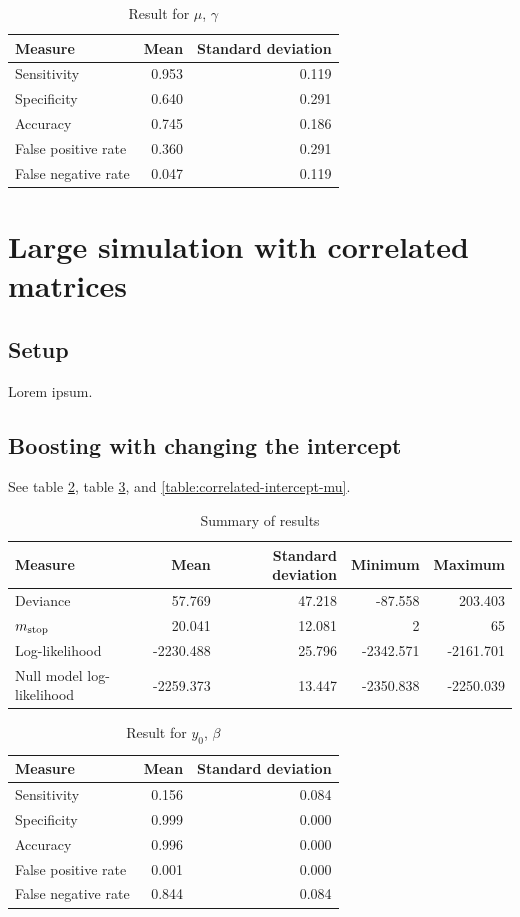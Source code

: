 \begin{table}\caption{Result for $\mu$, $\gamma$}\label{table:non-correlated-no-intercept-mu}
\begin{tabular}{l|rr}
Measure &  Mean & Standard deviation \\
\hline
Sensitivity & 0.953 & 0.119 \\
Specificity & 0.640 & 0.291 \\
Accuracy    & 0.745 & 0.186 \\
False positive rate         & 0.360 & 0.291 \\
False negative rate         & 0.047 & 0.119
\end{tabular}
\end{table}


\section{Large simulation with correlated matrices}
\subsection{Setup}
Lorem ipsum.

\subsection{Boosting with changing the intercept}
See table \ref{table:correlated-intercept-summary}, table \ref{table:correlated-intercept-y0}, and \ref{table:correlated-intercept-mu}.
\begin{table}\caption{Summary of results}\label{table:correlated-intercept-summary}
\begin{tabular}{l|rrrr}
Measure &    Mean &     Standard deviation &  Minimum & Maximum \\
\hline
Deviance    &    57.769 & 47.218 &   -87.558 &   203.403 \\
$m_{\text{stop}}$      &    20.041 & 12.081 &     2 &    65 \\
Log-likelihood      & -2230.488 & 25.796 & -2342.571 & -2161.701 \\
Null model log-likelihood & -2259.373 & 13.447 & -2350.838 & -2250.039
\end{tabular}
\end{table}

\begin{table}\caption{Result for $y_0$, $\beta$}\label{table:correlated-intercept-y0}
\begin{tabular}{l|rr}
Measure &  Mean &    Standard deviation \\
\hline
Sensitivity & 0.156 & 0.084 \\
Specificity & 0.999 & 0.000 \\
Accuracy    & 0.996 & 0.000 \\
False positive rate         & 0.001 & 0.000 \\
False negative rate         & 0.844 & 0.084
\end{tabular}
\end{table}



